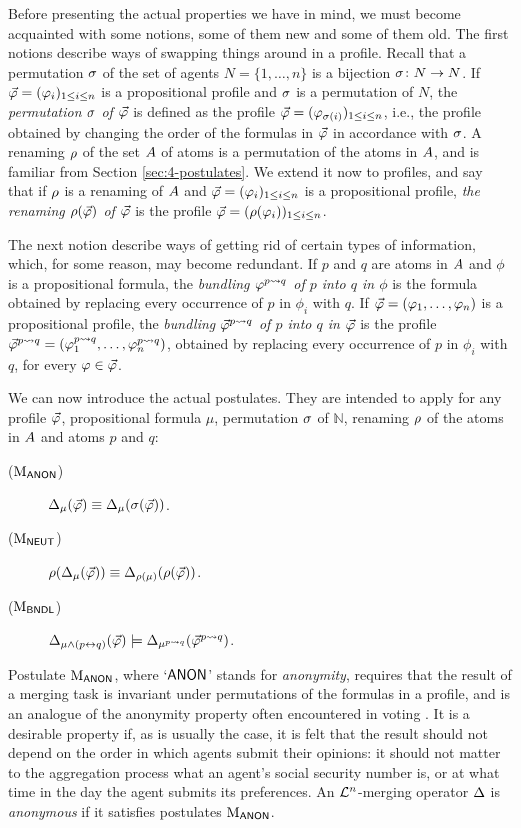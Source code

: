 Before presenting the actual properties we have in mind, 
we must become acquainted with some notions, some of them 
new and some of them old. 
The first notions describe ways of swapping things around 
in a profile.
Recall that a permutation $\perm$ of the set of agents $N=\{1,\dots,n\}$
is a bijection $\perm\colon N\rightarrow N$.
If $\P=(\phi_i)_{1\le i \le n}$ is a propositional profile 
and $\perm$ is a permutation of $N$,  
the \emph{permutation $\perm$ of $\P$} is defined as the profile 
$\P=(\phi_{\perm(i)})_{1\le i \le n}$,
i.e., the profile obtained by changing the order 
of the formulas in $\P$ in accordance with $\perm$. 
A renaming $\rnm$ of the set $\Atoms$ of atoms 
is a permutation of the atoms in $\Atoms$,
and is familiar from Section \ref{sec:4-postulates}. 
We extend it now to profiles, 
and say that if $\rnm$ is a renaming of $\Atoms$ and 
$\P=(\phi_i)_{1\le i \le n}$ is a propositional profile,
\emph{the renaming $\rnm(\P)$ of $\P$} is the profile 
$\P=(\rnm(\phi_i))_{1\le i \le n}$.

The next notion describe ways of getting rid of certain types 
of information, which, for some reason, may become redundant.
If $p$ and $q$ are atoms in $\Atoms$ and $\phi$ is a propositional formula,
the \emph{bundling $\phi^{p\bndl q}$ of $p$ into $q$ in $\phi$} 
is the formula obtained by replacing every occurrence of $p$ in $\phi_i$ with $q$.
If $\P=(\phi_1,\dots,\phi_n)$ is a propositional profile,
the \emph{bundling $\P^{p\bndl q}$ of $p$ into $q$ in $\P$}
is the profile $\P^{p\bndl q}=(\phi^{p\bndl q}_1,\dots,\phi^{p\bndl q}_n)$,
obtained by replacing every occurrence of $p$ in $\phi_i$ with $q$, 
for every $\phi\in \P$.

We can now introduce the actual postulates.
They are intended to apply 
for any profile $\P$, 
propositional formula $\mu$,
permutation $\perm$ of $\mathbb{N}$,
renaming $\rnm$ of the atoms in $\Atoms$ and
atoms $p$ and $q$:

\begin{description}
	\item[($\ppm{\ANON}$)] $\me_\mu(\P) \equiv \me_\mu(\perm(\P))$.
	\item[($\ppm{\NEUT}$)] $\rnm(\me_\mu(\P)) \equiv \me_{\rnm(\mu)}(\rnm(\P))$.
	\item[($\ppm{\BNDL}$)] $\me_{\mu \land (p \leftrightarrow q)}(\P) \models \me_{\mu^{p\bndl q}}(\P^{p\bndl q})$.
\end{description}

Postulate $\ppm{\ANON}$, where `$\ANON$' stands for \emph{anonymity}, requires that 
the result of a merging task is invariant under permutations of the formulas in 
a profile, 
and is an analogue of the anonymity property often encountered in voting \cite{BaumeisterR16,Zwicker16}.
It is a desirable property if, as is usually the case, 
it is felt that the result should not depend on the order
in which agents submit their opinions: 
it should not matter to the aggregation process what an agent's
social security number is, or at what time in the day the agent submits its preferences.
An $\L^{n}$-merging operator $\me$ is \emph{anonymous} if it satisfies postulates $\ppm{\ANON}$.

